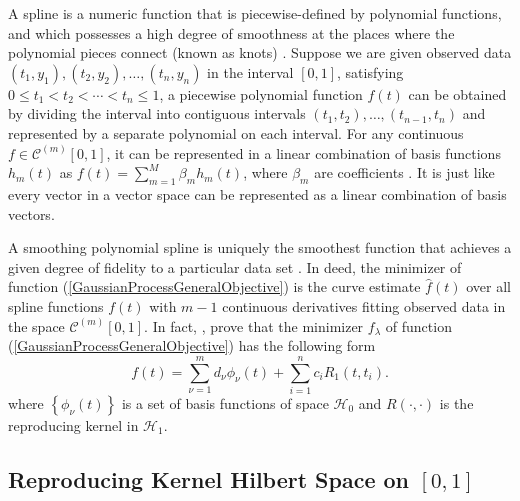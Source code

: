 A spline is a numeric function that is piecewise-defined by polynomial functions, and which possesses a high degree of smoothness at the places where the polynomial pieces connect (known as knots) \cite{judd1998numerical} \cite{chen2009feedback}. Suppose we are given observed data $(t_1,y_1),(t_2,y_2), \ldots, (t_n,y_n)$ in the interval $[0,1]$, satisfying $0\leq t_1< t_2 < \cdots <t_n \leq 1$, a piecewise polynomial function $f(t)$ can be obtained by dividing the interval into contiguous intervals $(t_1,t_2),\ldots,(t_{n-1},t_n)$ and represented by a separate polynomial on each interval. For any continuous $f\in \mathcal{C}^{(m)}[0,1]$, it can be represented in a linear combination of basis functions $h_m(t)$ as $f(t) =\sum_{m=1}^{M}\beta_mh_m(t)$, where $\beta_m$ are coefficients \cite{ellis2009}. It is just like every vector in a vector space can be represented as a linear combination of basis vectors. 



A smoothing polynomial spline is uniquely the smoothest function that achieves a given degree of fidelity to a particular data set \cite{whittaker1922new}. In deed, the minimizer of function (\ref{GaussianProcessGeneralObjective}) is the curve estimate $\hat{f}(t)$ over all spline functions $f(t)$ with $m-1$ continuous derivatives fitting observed data in the space $\mathcal{C}^{(m)}[0,1]$. In fact, \cite{kimeldorf1971some},  \cite{kimeldorf1970correspondence}  prove that the minimizer $f_\lambda$ of function (\ref{GaussianProcessGeneralObjective}) has the following form 
\begin{equation}
f(t)=\sum_{\nu=1}^m d_\nu \phi_\nu(t)+\sum_{i=1}^n c_iR_1(t,t_i).
\end{equation}
where $\left\lbrace \phi_\nu(t)\right\rbrace$ is a set of basis functions of space $\mathcal{H}_0$ and $R(\cdot,\cdot)$ is the reproducing kernel in $\mathcal{H}_1$. 



\subsection{Reproducing Kernel Hilbert Space on $[0,1]$}

